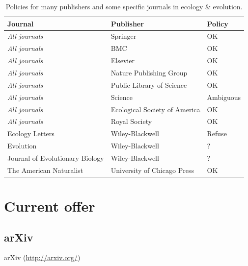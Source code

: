 \documentclass[letterpaper,twocolumn,superscriptaddress,showkeys]{revtex4}
\begin{document}
\begin{table}
    \centering
    \begin{tabular}{|lll|}
    \hline
    Journal                 			&   Publisher                           & Policy \\
    \hline
    \emph{All journals}     			& Springer                            	& OK \\
    \emph{All journals}     			& BMC                                 	& OK \\
    \emph{All journals}            		& Elsevier                            	& OK \\
    \emph{All journals}            		& Nature Publishing Group             	& OK \\
    \emph{All journals}            		& Public Library of Science           	& OK \\
    \emph{All journals}            		& Science                             	& Ambiguous \\
    \emph{All journals}            		& Ecological Society of America       	& OK \\
    \emph{All journals}            		& Royal Society                       	& OK \\
    Ecology Letters						& Wiley-Blackwell                   	& Refuse \\
    Evolution   						& Wiley-Blackwell                     	& ? \\
    Journal of Evolutionary Biology 	& Wiley-Blackwell   					& ? \\
    The American Naturalist 			& University of Chicago Press           & OK \\
    \hline
    \end{tabular}
    \caption{Policies for many publishers and some specific journals in ecology
\& evolution.}
    \label{table:policies}
\end{table}

\section{Current offer}


\subsection{arXiv}

arXiv (\href{http://arxiv.org/}{http://arxiv.org/})
\end{document}
